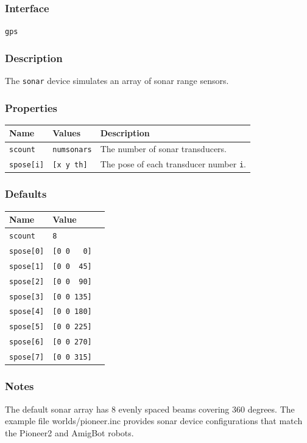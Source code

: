 \documentclass[11pt,twoside]{report}
\begin{document}
\subsubsection*{Interface}
{\tt gps}

\subsubsection*{Description}
The {\tt sonar} device simulates an array of sonar range sensors.

\subsubsection*{Properties}
\begin{tabularx}{\columnwidth}{llX}
\hline
Name & Values & Description \\
\hline
\verb'scount' & \verb'numsonars' & The number of sonar transducers.\\
\verb'spose[i]' & \verb'[x y th]' & The pose of each transducer number {\tt i}.\\
\hline
\end{tabularx}

\subsubsection*{Defaults}
\begin{tabularx}{\columnwidth}{llX}
\hline
Name & Value\\
\hline
\verb'scount' & \verb'8'\\
\verb'spose[0]' & \verb'[0 0   0]'\\
\verb'spose[1]' & \verb'[0 0  45]'\\
\verb'spose[2]' & \verb'[0 0  90]'\\
\verb'spose[3]' & \verb'[0 0 135]'\\
\verb'spose[4]' & \verb'[0 0 180]'\\
\verb'spose[5]' & \verb'[0 0 225]'\\
\verb'spose[6]' & \verb'[0 0 270]'\\
\verb'spose[7]' & \verb'[0 0 315]'\\
\hline
\end{tabularx}

\subsubsection*{Notes}
The default sonar array has 8 evenly spaced beams covering 360
degrees. The example file worlds/pioneer.inc provides sonar device
configurations that match the Pioneer2 and AmigBot robots.
\end{document}
